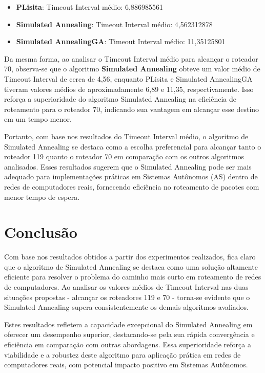 \documentclass[conference]{IEEEtran}
\begin{document}
\begin{itemize}
    \item \textbf{PLisita}: Timeout Interval médio: 6,886985561
    \item \textbf{Simulated Annealing}: Timeout Interval médio: 4,562312878
    \item \textbf{Simulated AnnealingGA}: Timeout Interval médio: 11,35125801
\end{itemize}

Da mesma forma, ao analisar o Timeout Interval médio para alcançar o roteador 70, observa-se que o algoritmo \textbf{Simulated Annealing} obteve um valor médio de Timeout Interval de cerca de 4,56, enquanto PLisita e Simulated AnnealingGA tiveram valores médios de aproximadamente 6,89 e 11,35, respectivamente. Isso reforça a superioridade do algoritmo Simulated Annealing na eficiência de roteamento para o roteador 70, indicando sua vantagem em alcançar esse destino em um tempo menor.

Portanto, com base nos resultados do Timeout Interval médio, o algoritmo de Simulated Annealing se destaca como a escolha preferencial para alcançar tanto o roteador 119 quanto o roteador 70 em comparação com os outros algoritmos analisados. Esses resultados sugerem que o Simulated Annealing pode ser mais adequado para implementações práticas em Sistemas Autônomos (AS) dentro de redes de computadores reais, fornecendo eficiência no roteamento de pacotes com menor tempo de espera.


\section{Conclusão}
Com base nos resultados obtidos a partir dos experimentos realizados, fica claro que o algoritmo de Simulated Annealing se destaca como uma solução altamente eficiente para resolver o problema do caminho mais curto em roteamento de redes de computadores. Ao analisar os valores médios de Timeout Interval nas duas situações propostas - alcançar os roteadores 119 e 70 - torna-se evidente que o Simulated Annealing supera consistentemente os demais algoritmos avaliados.

Estes resultados refletem a capacidade excepcional do Simulated Annealing em oferecer um desempenho superior, destacando-se pela sua rápida convergência e eficiência em comparação com outras abordagens. Essa superioridade reforça a viabilidade e a robustez deste algoritmo para aplicação prática em redes de computadores reais, com potencial impacto positivo em Sistemas Autônomos.
\end{document}
